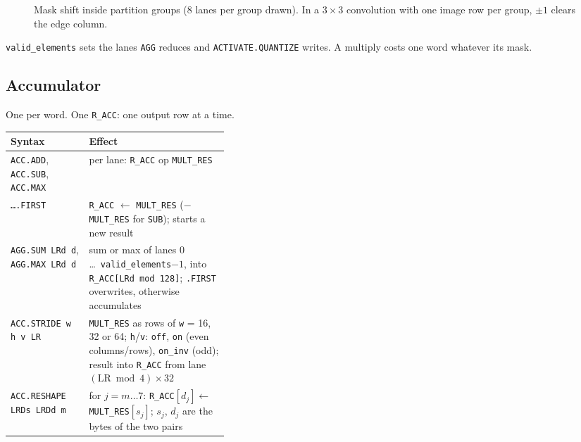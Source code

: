 \documentclass[11pt,a4paper]{article}
\begin{document}
\begin{figure}[H]\centering
{}
\caption{Mask shift inside partition groups (8 lanes per group drawn). In a
$3\times3$ convolution with one image row per group, $\pm 1$ clears the edge
column.}
\end{figure}

\texttt{valid\_elements} sets the lanes \texttt{AGG} reduces and
\texttt{ACTIVATE.QUANTIZE} writes. A multiply costs one word whatever its mask.

\needspace{6cm}
\subsection{Accumulator}

One per word. One \texttt{R\_ACC}: one output row at a time.

\begin{center}
\small
\begin{tabularx}{\linewidth}{>{\raggedright\arraybackslash}p{0.36\linewidth}>{\raggedright\arraybackslash}X}
\toprule
Syntax & Effect \\
\midrule
\texttt{ACC.ADD}, \texttt{ACC.SUB}, \texttt{ACC.MAX} & per lane:
\texttt{R\_ACC} op \texttt{MULT\_RES} \\
\texttt{\ldots .FIRST} & \texttt{R\_ACC} $\leftarrow$ \texttt{MULT\_RES}
($-$\texttt{MULT\_RES} for \texttt{SUB}); starts a new result \\
\texttt{AGG.SUM LRd d}, \texttt{AGG.MAX LRd d} & sum or max of lanes 0 \ldots\
\texttt{valid\_elements}$-1$, into \texttt{R\_ACC[LRd mod 128]};
\texttt{.FIRST} overwrites, otherwise accumulates \\
\texttt{ACC.STRIDE w h v LR} & \texttt{MULT\_RES} as rows of \texttt{w} = 16, 32
or 64; \texttt{h}/\texttt{v}: \texttt{off}, \texttt{on} (even columns/rows),
\texttt{on\_inv} (odd); result into \texttt{R\_ACC} from lane
$(\mathrm{LR} \bmod 4) \times 32$ \\
\texttt{ACC.RESHAPE LRDs LRDd m} & for $j = m \ldots 7$:
\texttt{R\_ACC}$[d_j] \leftarrow$ \texttt{MULT\_RES}$[s_j]$; $s_j$, $d_j$ are
the bytes of the two pairs \\
\bottomrule
\end{tabularx}
\end{center}
\end{document}
